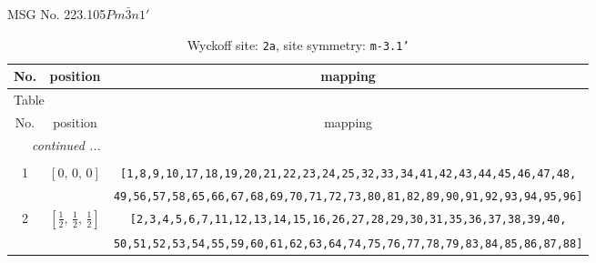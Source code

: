 \documentclass[fleqn,8pt]{jsarticle}
\begin{document}
\setcounter{MaxMatrixCols}{32}

\renewcommand{\tablename}{Table~}
\renewcommand{\figurename}{Figure~}
\begin{center}
\LARGE
MSG No. 223.105\quad$Pm\bar{3}n1'$
\end{center}
\renewcommand{\arraystretch}{1.2}
\begin{longtable}{ccc}
\caption{Wyckoff site: {\tt 2a}, site symmetry: {\tt m-3.1'}}
 \\
 \hline \hline
No. & position & mapping \\ \hline \endfirsthead

\multicolumn{2}{l}{\tablename\ \thetable{}} \\
 \hline \hline
No. & position & mapping \\ \hline \endhead

 \hline \hline
\multicolumn{2}{r}{\footnotesize\it continued ...} \\ \endfoot

 \hline \hline
\multicolumn{2}{r}{} \\ \endlastfoot

1 & $\left[ 0,\, 0,\, 0 \right]$ & {\tt [1,8,9,10,17,18,19,20,21,22,23,24,25,32,33,34,41,42,43,44,45,46,47,48,} \\ \hline
 &  & {\tt 49,56,57,58,65,66,67,68,69,70,71,72,73,80,81,82,89,90,91,92,93,94,95,96]} \\ \hline
2 & $\left[ \frac{1}{2},\, \frac{1}{2},\, \frac{1}{2} \right]$ & {\tt [2,3,4,5,6,7,11,12,13,14,15,16,26,27,28,29,30,31,35,36,37,38,39,40,} \\ \hline
 &  & {\tt 50,51,52,53,54,55,59,60,61,62,63,64,74,75,76,77,78,79,83,84,85,86,87,88]} \\
\end{longtable}
\renewcommand{\arraystretch}{1.2}
\end{document}
